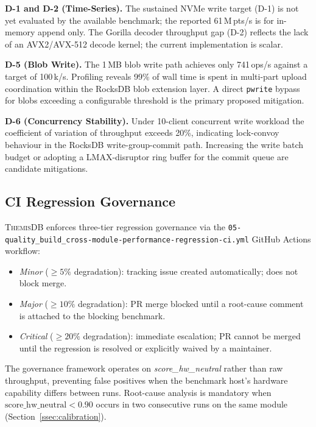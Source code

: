 \documentclass[conference]{IEEEtran}
\newcommand{\themis}{\textsc{ThemisDB}}
\begin{document}
\textbf{D-1 and D-2 (Time-Series).}
The sustained NVMe write target (D-1) is not yet evaluated by the
available benchmark; the reported 61\,M\,pts/s is for in-memory
append only.
The Gorilla decoder throughput gap (D-2) reflects the lack of an
AVX2/AVX-512 decode kernel; the current implementation is scalar.

\textbf{D-5 (Blob Write).}
The 1\,MB blob write path achieves only 741\,ops/s against a target
of 100\,k/s.
Profiling reveals 99\% of wall time is spent in multi-part
upload coordination within the RocksDB blob extension layer.
A direct \texttt{pwrite} bypass for blobs exceeding a configurable
threshold is the primary proposed mitigation.

\textbf{D-6 (Concurrency Stability).}
Under 10-client concurrent write workload the coefficient of variation
of throughput exceeds 20\%, indicating lock-convoy behaviour in the
RocksDB write-group-commit path.
Increasing the write batch budget or adopting a LMAX-disruptor ring
buffer for the commit queue are candidate mitigations.

\subsection{CI Regression Governance}
\label{ssec:ci-gov}

\themis{} enforces three-tier regression governance via the
\texttt{05-quality\_build\_cross-module-performance-regression-ci.yml}
GitHub Actions workflow:

\begin{itemize}
  \item \emph{Minor} ($\geq 5\%$ degradation): tracking issue created
        automatically; does not block merge.
  \item \emph{Major} ($\geq 10\%$ degradation): PR merge blocked until
        a root-cause comment is attached to the blocking benchmark.
  \item \emph{Critical} ($\geq 20\%$ degradation): immediate
        escalation; PR cannot be merged until the regression is
        resolved or explicitly waived by a maintainer.
\end{itemize}

\noindent
The governance framework operates on \emph{score\_hw\_neutral} rather
than raw throughput, preventing false positives when the benchmark
host's hardware capability differs between runs.
Root-cause analysis is mandatory when
$\text{score\_hw\_neutral} < 0.90$ occurs in two consecutive runs
on the same module (Section~\ref{ssec:calibration}).
\end{document}
